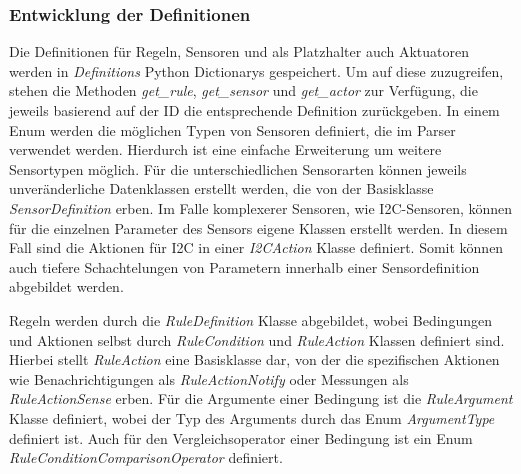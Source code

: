 \subsubsection{Entwicklung der Definitionen}
Die Definitionen für Regeln, Sensoren und als Platzhalter auch Aktuatoren werden in \emph{Definitions} Python Dictionarys gespeichert.
Um auf diese zuzugreifen, stehen die Methoden \emph{get\_rule}, \emph{get\_sensor} und \emph{get\_actor} zur Verfügung, die jeweils basierend auf der ID die entsprechende Definition zurückgeben.
In einem Enum werden die möglichen Typen von Sensoren definiert, die im Parser verwendet werden.
Hierdurch ist eine einfache Erweiterung um weitere Sensortypen möglich.
Für die unterschiedlichen Sensorarten können jeweils unveränderliche Datenklassen erstellt werden, die von der Basisklasse \emph{SensorDefinition} erben.
Im Falle komplexerer Sensoren, wie I2C-Sensoren, können für die einzelnen Parameter des Sensors eigene Klassen erstellt werden.
In diesem Fall sind die Aktionen für I2C in einer \emph{I2CAction} Klasse definiert.
Somit können auch tiefere Schachtelungen von Parametern innerhalb einer Sensordefinition abgebildet werden.

Regeln werden durch die \emph{RuleDefinition} Klasse abgebildet, wobei Bedingungen und Aktionen selbst durch \emph{RuleCondition} und \emph{RuleAction} Klassen definiert sind.
Hierbei stellt \emph{RuleAction} eine Basisklasse dar, von der die spezifischen Aktionen wie Benachrichtigungen als \emph{RuleActionNotify} oder Messungen als \emph{RuleActionSense} erben.
Für die Argumente einer Bedingung ist die \emph{RuleArgument} Klasse definiert, wobei der Typ des Arguments durch das Enum \emph{ArgumentType} definiert ist.
Auch für den Vergleichsoperator einer Bedingung ist ein Enum \emph{RuleConditionComparisonOperator} definiert.

